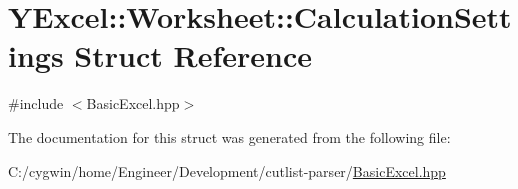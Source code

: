 \hypertarget{struct_y_excel_1_1_worksheet_1_1_calculation_settings}{}\section{Y\+Excel\+:\+:Worksheet\+:\+:Calculation\+Settings Struct Reference}
\label{struct_y_excel_1_1_worksheet_1_1_calculation_settings}


{\ttfamily \#include $<$Basic\+Excel.\+hpp$>$}



The documentation for this struct was generated from the following file\+:\begin{DoxyCompactItemize}
\item 
C\+:/cygwin/home/\+Engineer/\+Development/cutlist-\/parser/\hyperlink{_basic_excel_8hpp}{Basic\+Excel.\+hpp}\end{DoxyCompactItemize}

